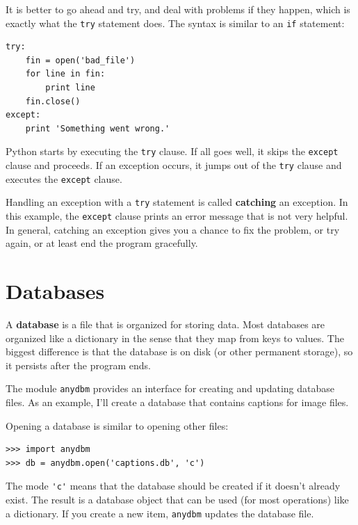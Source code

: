 \documentclass[10pt]{book}
\begin{document}
{

It is better to go ahead and try, and deal with problems if they
happen, which is exactly what the {\tt try} statement does.  The
syntax is similar to an {\tt if} statement:

\beforeverb
\begin{verbatim}
try:    
    fin = open('bad_file')
    for line in fin:
        print line
    fin.close()
except:
    print 'Something went wrong.'
\end{verbatim}
\afterverb
%
Python starts by executing the {\tt try} clause.  If all goes
well, it skips the {\tt except} clause and proceeds.  If an
exception occurs, it jumps out of the {\tt try} clause and
executes the {\tt except} clause.

Handling an exception with a {\tt try} statement is called {\bf
catching} an exception.  In this example, the {\tt except} clause
prints an error message that is not very helpful.  In general,
catching an exception gives you a chance to fix the problem, or try
again, or at least end the program gracefully.


\section{Databases}


A {\bf database} is a file that is organized for storing data.
Most databases are organized like a dictionary in the sense
that they map from keys to values.  The biggest difference
is that the database is on disk (or other permanent storage),
so it persists after the program ends.


The module {\tt anydbm} provides an interface for creating
and updating database files.  As an example, I'll create a database
that contains captions for image files.


Opening a database is similar
to opening other files:

\beforeverb
\begin{verbatim}
>>> import anydbm
>>> db = anydbm.open('captions.db', 'c')
\end{verbatim}
\afterverb
%
The mode \verb"'c'" means that the database should be created if
it doesn't already exist.  The result is a database object
that can be used (for most operations) like a dictionary.
If you create a new item, {\tt anydbm} updates the database file.

}
\end{document}
